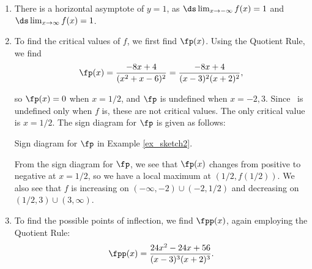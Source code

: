{\begin{enumerate}
		\item		There is a horizontal asymptote of $y=1$, as $\ds \lim_{x\to -\infty}f(x) = 1$ and $\ds\lim_{x\to\infty}f(x) =1$.

\drawexampleline

		\item		To find the critical values of $f$, we first find $\fp(x)$. Using the Quotient Rule, we find 
\[
\fp(x) = \frac{-8x+4}{(x^2+x-6)^2} = \frac{-8x+4}{(x-3)^2(x+2)^2},
\]
		
		so $\fp(x) = 0$ when $x = 1/2$, and $\fp$ is undefined when $x=-2,3$. Since \fp\ is undefined only when $f$ is, these are not critical values. The only critical value is $x=1/2$. The sign diagram for $\fp$ is given as follows:
		
\noindent\begin{minipage}{\textwidth}
\begin{center}
\end{center}
\captionsetup{type=figure}%
			\caption{Sign diagram for $\fp$ in Example \ref{ex_sketch2}.}\label{fig:sketchline2fp}
\end{minipage}		
	
	From the sign diagram for $\fp$, we see that $\fp(x)$ changes from positive to negative at $x=1/2$, so we have a local maximum at $(1/2,f(1/2))$. We also see that $f$ is increasing on $(-\infty,-2)\cup(-2,1/2)$ and decreasing on $(1/2,3)\cup (3,\infty)$.
		
		\item		To find the possible points of inflection, we find $\fpp(x)$, again employing the Quotient Rule: 
\[
\fpp(x) = \frac{24x^2-24x+56}{(x-3)^3(x+2)^3}.
\]
		

\end{enumerate}}
